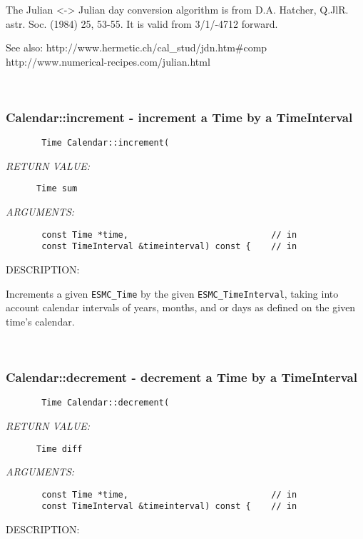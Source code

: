        The Julian <-> Julian day conversion algorithm is from D.A. Hatcher,
       Q.JlR. astr. Soc. (1984) 25, 53-55.  It is valid from 3/1/-4712 forward.
  
       See also:  http://www.hermetic.ch/cal\_stud/jdn.htm\#comp
                  http://www.numerical-recipes.com/julian.html
   
 
\mbox{}\hrulefill\ 
 
\subsubsection [Calendar::increment] {Calendar::increment - increment a Time by a TimeInterval}


  
\begin{verbatim}       Time Calendar::increment(\end{verbatim}{\em RETURN VALUE:}
\begin{verbatim}      Time sum\end{verbatim}{\em ARGUMENTS:}
\begin{verbatim}       const Time *time,                            // in
       const TimeInterval &timeinterval) const {    // in
 \end{verbatim}
{\sf DESCRIPTION:\\ }


       Increments a given {\tt ESMC\_Time} by the given
       {\tt ESMC\_TimeInterval}, taking into account calendar intervals of
       years, months, and or days as defined on the given time's calendar.
   
 
\mbox{}\hrulefill\ 
 
\subsubsection [Calendar::decrement] {Calendar::decrement - decrement a Time by a TimeInterval}


  
\begin{verbatim}       Time Calendar::decrement(\end{verbatim}{\em RETURN VALUE:}
\begin{verbatim}      Time diff\end{verbatim}{\em ARGUMENTS:}
\begin{verbatim}       const Time *time,                            // in
       const TimeInterval &timeinterval) const {    // in
 \end{verbatim}
{\sf DESCRIPTION:\\ }


